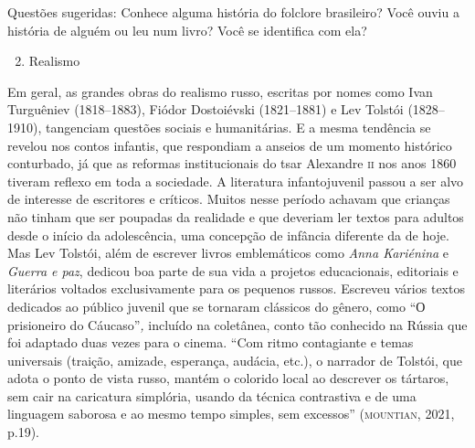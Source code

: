 \documentclass[11pt]{extarticle}
\begin{document}
Questões sugeridas:
Conhece alguma história do folclore brasileiro? Você ouviu a história de
alguém ou leu num livro? Você se identifica com ela?

\begin{enumerate}
\setcounter{enumi}{1}
\item Realismo
\end{enumerate}


Em geral, as grandes obras
do realismo russo, escritas por nomes como Ivan Turguêniev (1818--1883),
Fiódor Dostoiévski (1821--1881) e Lev Tolstói (1828--1910), tangenciam
questões sociais e humanitárias. E a mesma tendência se revelou nos
contos infantis, que respondiam a anseios de um momento histórico
conturbado, já que as reformas institucionais do tsar Alexandre \textsc{ii} nos
anos 1860 tiveram reflexo em toda a sociedade. A literatura
infantojuvenil passou a ser alvo de interesse de escritores e críticos.
Muitos nesse período achavam que crianças não tinham que ser poupadas da
realidade e que deveriam ler textos para adultos desde o início da
adolescência, uma concepção de infância diferente da de hoje. Mas Lev
Tolstói, além de escrever livros emblemáticos como \emph{Anna Kariénina}
e \emph{Guerra e paz}, dedicou boa parte de sua vida a projetos
educacionais, editoriais e literários voltados exclusivamente para os
pequenos russos. Escreveu vários textos dedicados ao público juvenil que
se tornaram clássicos do gênero, como ``О prisioneiro do
Cáucaso''\emph{,} incluído na coletânea, conto tão conhecido na Rússia
que foi adaptado duas vezes para o cinema. ``Com ritmo contagiante e
temas universais (traição, amizade, esperança, audácia, etc.), o
narrador de Tolstói, que adota o ponto de vista russo, mantém o colorido
local ao descrever os tártaros, sem cair na caricatura simplória, usando
da técnica contrastiva e de uma linguagem saborosa e ao mesmo tempo
simples, sem excessos'' (\textsc{mountian}, 2021, p.19).

\end{document}
